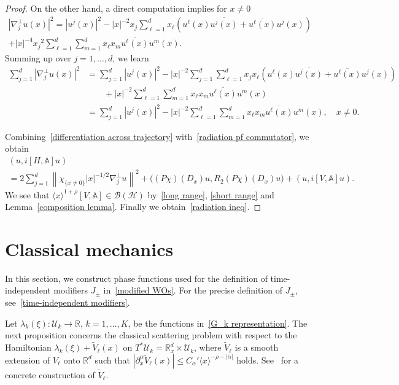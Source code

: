 \documentclass[10pt,a4paper]{amsart}
\renewcommand{\a}{\alpha}
\renewcommand{\l}{\lambda}
\newcommand{\x}{\xi}
\newcommand{\R}{\mathbb{R}}
\newcommand{\bbA}{\mathbb{A}}
\newcommand{\HS}{\mathcal{H}}
\newcommand{\US}{\mathcal{U}}
\newcommand{\BS}{\mathcal{B}}
\newcommand{\la}{\langle}
\newcommand{\ra}{\rangle}
\newcommand{\jap}[1]{\langle #1 \rangle}
\begin{document}
\begin{proof}
On the other hand, a direct computation implies for $x\neq0$
\begin{multline*}
\left| \nabla_{j}^\perp u (x) \right|^2 
= \left|u^j(x)\right|^2 - |x|^{-2} x_j \sum_{\ell=1}^d x_\ell \left(u^\ell(x)\overline{u^j(x)}+\overline{u^\ell(x)}u^j(x) \right) \\
+ |x|^{-4} {x_j}^2 \sum_{\ell=1}^d \sum_{m=1}^d x_\ell x_m \overline{u^\ell(x)}u^m(x).
\end{multline*}
Summing up over $j=1,\dots,d$, we learn
\begin{equation}\label{differentiation across trajectory}
\begin{split}
\sum_{j=1}^d \left| \nabla_{j}^\perp u (x) \right|^2 
&= \sum_{j=1}^d \left|u^j(x)\right|^2 - |x|^{-2} \sum_{j=1}^d \sum_{\ell=1}^d x_j x_\ell \left(u^\ell(x)\overline{u^j(x)}+\overline{u^\ell(x)}u^j(x) \right) \\
& \qquad + |x|^{-2} \sum_{\ell=1}^d \sum_{m=1}^d x_\ell x_m \overline{u^\ell(x)}u^m(x) \\
&= \sum_{j=1}^d \left|u^j(x)\right|^2 - |x|^{-2} \sum_{\ell=1}^d \sum_{m=1}^d x_\ell x_m \overline{u^\ell(x)}u^m(x), \quad x\neq0.
\end{split}
\end{equation}

Combining~\eqref{differentiation across trajectory} with~\eqref{radiation pf commutator}, we obtain
\begin{multline*}
\left(u, i[H,\bbA]u\right)\\
= 2\sum_{j=1}^d \left\| \chi_{\{x\neq0\}}|x|^{-1/2} \nabla_{j}^\perp u \right\|^2 
+ \bigl((P\chi)(D_x)u, R_2 (P\chi)(D_x)u\bigr) + (u, i[V,\bbA] u).
\end{multline*}
We see that $\jap{x}^{1+\rho} [V,\bbA] \in \BS(\HS)$ by~\eqref{long range}, \eqref{short range} and Lemma~\ref{composition lemma}. Finally we obtain~\eqref{radiation ineq}.
\end{proof}


\section{Classical mechanics}\label{classical section}

In this section, we construct phase functions used for the definition of time-independent modifiers $J_\pm$ in~\eqref{modified WOs}. For the precise definition of $J_\pm$, see~\eqref{time-independent modifiers}.

Let $\l_k(\x):\US_k\to\R$, $k=1,\dots,K$, be the functions in~\eqref{G_k representation}. The next proposition concerns the classical scattering problem with respect to the Hamiltonian $\l_k(\x)+\tilde V_\ell(x)$ on $T^*\US_k=\R_x^d\times\US_k$, where $\tilde V_\ell$ is a smooth extension of $V_\ell$ onto $\R^d$ such that $|\partial_x^\a \tilde V_\ell(x)|\leq C_\a' \la x \ra^{-\rho-|\a|}$ holds. See~\cite[Lemma~2.1]{N} for a concrete construction of $\tilde V_\ell$.
\end{document}
